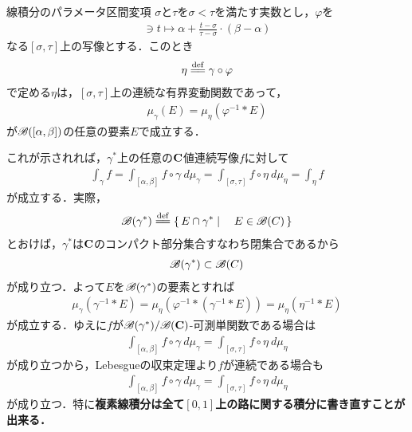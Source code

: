 	\begin{itembox}[l]{線積分のパラメータ区間変項}
		$\sigma$と$\tau$を$\sigma < \tau$を満たす実数とし，$\varphi$を
		\begin{align}
			[\sigma,\tau] \ni t \longmapsto \alpha + \frac{t - \sigma}{\tau - \sigma} \cdot (\beta - \alpha)
		\end{align}
		なる$[\sigma,\tau]$上の写像とする．このとき
		\begin{align}
			\eta \defeq \gamma \circ \varphi
		\end{align}
		で定める$\eta$は，$[\sigma,\tau]$上の連続な有界変動関数であって，
		\begin{align}
			\mu_{\gamma}(E) = \mu_{\eta} \left(\varphi^{-1} \ast E\right)
		\end{align}
		が$\mathscr{B}([\alpha,\beta])$の任意の要素$E$で成立する．
	\end{itembox}
	
	これが示されれば，$\gamma^*$上の任意の$\mathbf{C}$値連続写像$f$に対して
	\begin{align}
		\int_{\gamma} f = \int_{[\alpha,\beta]} f \circ \gamma\ d\mu_{\gamma}
		= \int_{[\sigma,\tau]} f \circ \eta\ d\mu_{\eta} = \int_{\eta} f
	\end{align}
	が成立する．実際，
	\begin{align}
		\borel{\gamma^*} \defeq \Set{E \cap \gamma^*}{E \in \borel{C}}
	\end{align}
	とおけば，$\gamma^*$は$\mathbf{C}$のコンパクト部分集合すなわち閉集合であるから
	\begin{align}
		\mathscr{B}(\gamma^*) \subset \mathscr{B}(C)
	\end{align}
	が成り立つ．よって$E$を$\mathscr{B}(\gamma^*)$の要素とすれば
	\begin{align}
		\mu_{\gamma}\left(\gamma^{-1} \ast E\right)
		= \mu_{\eta}\left(\varphi^{-1} \ast (\gamma^{-1} \ast E)\right)
		= \mu_{\eta}\left(\eta^{-1} \ast E\right)
	\end{align}
	が成立する．ゆえに$f$が$\mathscr{B}(\gamma^*)/\mathscr{B}(\mathbf{C})$-可測単関数である場合は
	\begin{align}
		\int_{[\alpha,\beta]} f \circ \gamma\ d\mu_{\gamma} = \int_{[\sigma,\tau]} f \circ \eta\ d\mu_{\eta}
	\end{align}
	が成り立つから，Lebesgueの収束定理より$f$が連続である場合も
	\begin{align}
		\int_{[\alpha,\beta]} f \circ \gamma\ d\mu_{\gamma} = \int_{[\sigma,\tau]} f \circ \eta\ d\mu_{\eta}
	\end{align}
	が成り立つ．特に{\bf 複素線積分は全て$[0,1]$上の路に関する積分に書き直すことが出来る．}
	

